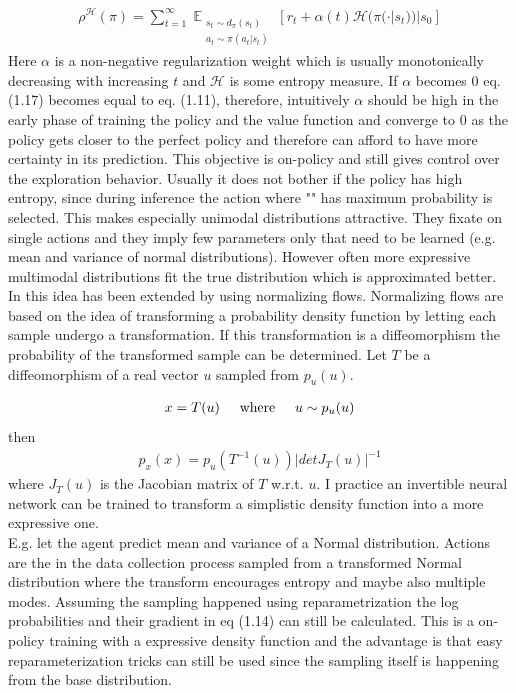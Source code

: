 \begin{align}
\rho^{\mathcal{H}}(\pi) = \sum_{t=1}^{\infty}\mathop{\mathbb{E}}_{\substack{s_t \sim d_\pi(s_t) \\ a_t \sim \pi(a_t|s_t)}} \left[ r_t + \alpha(t) \mathcal{H}(\pi(\cdot | s_t))|s_0 \right]
\end{align}
Here $\alpha$ is a non-negative regularization weight which is usually monotonically decreasing with increasing $t$ and $\mathcal{H}$ is some entropy measure. If $\alpha$ becomes $0$ eq. (1.17) becomes equal to eq. (1.11), therefore, intuitively $\alpha$ should be high in the early phase of training the policy and the value function and converge to $0$ as the policy gets closer to the perfect policy and therefore can afford to have more certainty in its prediction.
This objective is on-policy and still gives control over the exploration behavior. Usually it does not bother if the policy has high entropy, since during inference the action where "\pi" has maximum probability is selected. This makes especially unimodal distributions attractive. They fixate on single actions and they imply few parameters only that need to be learned (e.g. mean and variance of normal distributions). However often more expressive multimodal distributions fit the true distribution which is approximated better. 
In \cite{DBLP:journals/corr/abs-1906-02771} this idea has been extended by using  normalizing flows. Normalizing flows \cite{papamakarios2019normalizing} are based on the idea of transforming a probability density function by letting each sample undergo a transformation. If this transformation is a diffeomorphism the probability of the transformed sample can be determined. Let $T$ be a diffeomorphism of a real vector $u$ sampled from $p_u(u)$.

\begin{align}
	x=T(u) \text{\hspace{5mm}where\hspace{5mm}} u\sim p_u(u)
\end{align}
then
\begin{align}
p_x(x)=p_u(T^{-1}(u)) |detJ_T(u)|^{-1}
\end{align}
where $J_T(u)$ is the Jacobian matrix of $T$ w.r.t. $u$. I practice an invertible neural network can be trained to transform a simplistic density function into a more expressive one.\\
E.g. let the agent predict mean and variance of a Normal distribution. Actions are the in the data collection process sampled from a transformed Normal distribution where the transform encourages entropy and maybe also multiple modes. Assuming the sampling happened using reparametrization the log probabilities and their gradient in eq (1.14) can still be calculated. This is a on-policy training with a expressive density function and the advantage is that easy reparameterization tricks can still be used since the sampling itself is happening from the base distribution.


